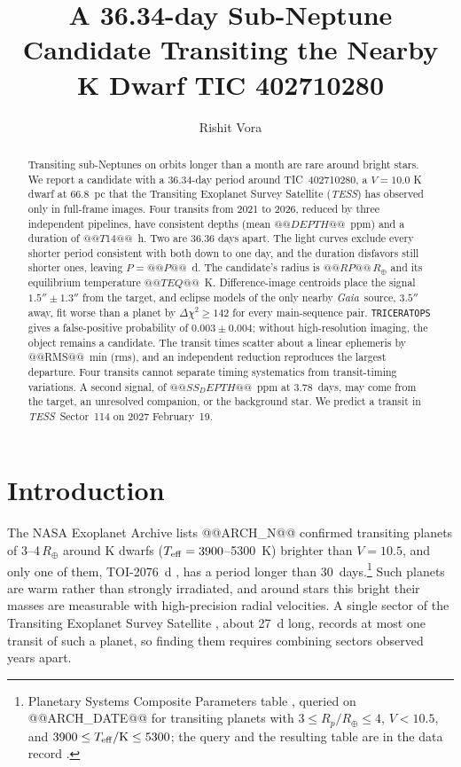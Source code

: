 \documentclass[twocolumn,linenumbers]{aastex701}
\newcommand{\tic}{TIC~402710280}
\newcommand{\tess}{\textit{TESS}}
\newcommand{\gaia}{\textit{Gaia}}
\newcommand{\rearth}{R_\oplus}
\begin{document}
\title{A 36.34-day Sub-Neptune Candidate Transiting the Nearby K Dwarf TIC 402710280}

\author[orcid=0009-0003-8778-9883,gname=Rishit,sname=Vora]{Rishit Vora}

\begin{abstract}
Transiting sub-Neptunes on orbits longer than a month are rare around bright stars. We report a candidate with a 36.34-day period around \tic, a $V = 10.0$ K dwarf at 66.8~pc that the Transiting Exoplanet Survey Satellite (\tess) has observed only in full-frame images. Four transits from 2021 to 2026, reduced by three independent pipelines, have consistent depths (mean $@@DEPTH@@$~ppm) and a duration of $@@T14@@$~h. Two are 36.36 days apart. The light curves exclude every shorter period consistent with both down to one day, and the duration disfavors still shorter ones, leaving $P = @@P@@$~d. The candidate's radius is $@@RP@@\,\rearth$ and its equilibrium temperature $@@TEQ@@$~K. Difference-image centroids place the signal $1.5'' \pm 1.3''$ from the target, and eclipse models of the only nearby \gaia\ source, $3.5''$ away, fit worse than a planet by $\Delta\chi^2 \geq 142$ for every main-sequence pair. \texttt{TRICERATOPS} gives a false-positive probability of $0.003 \pm 0.004$; without high-resolution imaging, the object remains a candidate. The transit times scatter about a linear ephemeris by @@RMS@@~min (rms), and an independent reduction reproduces the largest departure. Four transits cannot separate timing systematics from transit-timing variations. A second signal, of $@@SS_DEPTH@@$~ppm at 3.78~days, may come from the target, an unresolved companion, or the background star. We predict a transit in \tess\ Sector~114 on 2027 February~19.
\end{abstract}


\section{Introduction} \label{sec:intro}

The NASA Exoplanet Archive lists @@ARCH_N@@ confirmed transiting planets of 3--4\,$\rearth$ around K dwarfs ($T_{\rm eff} = 3900$--5300~K) brighter than $V = 10.5$, and only one of them, TOI-2076~d \citep[$P = @@ARCH_P@@$~d;][]{Hedges2021}, has a period longer than 30~days.\footnote{Planetary Systems Composite Parameters table \citep{NEAcomp}, queried on @@ARCH_DATE@@ for transiting planets with $3 \leq R_p/\rearth \leq 4$, $V < 10.5$, and $3900 \leq T_{\rm eff}/{\rm K} \leq 5300$; the query and the resulting table are in the data record \citep{DataRecord}.} Such planets are warm rather than strongly irradiated, and around stars this bright their masses are measurable with high-precision radial velocities. A single sector of the Transiting Exoplanet Survey Satellite \citep[\tess;][]{Ricker2015}, about 27~d long, records at most one transit of such a planet, so finding them requires combining sectors observed years apart.
\end{document}
